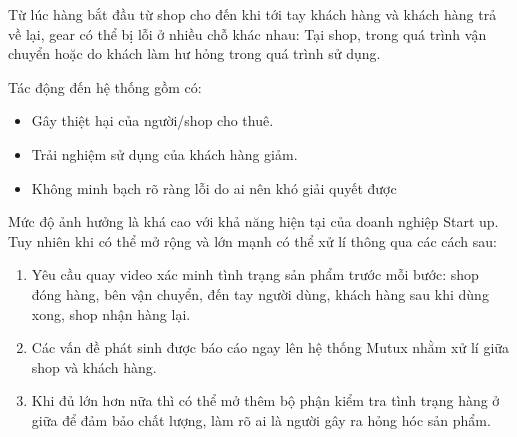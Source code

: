 Từ lúc hàng bắt đầu từ shop cho đến khi tới tay khách hàng và khách hàng trả về lại, gear có thể bị lỗi ở nhiều chỗ khác nhau: Tại shop, trong quá trình vận chuyển hoặc do khách làm hư hỏng trong quá trình sử dụng.

Tác động đến hệ thống gồm có:
\begin{itemize}
    \item Gây thiệt hại của người/shop cho thuê.
    \item Trải nghiệm sử dụng của khách hàng giảm.
    \item Không minh bạch rõ ràng lỗi do ai nên khó giải quyết được
\end{itemize}

Mức độ ảnh hưởng là khá cao với khả năng hiện tại của doanh nghiệp Start up. Tuy nhiên khi có thể mở rộng và lớn mạnh có thể xử lí thông qua các cách sau:

\begin{enumerate}
    \item Yêu cầu quay video xác minh tình trạng sản phẩm trước mỗi bước: shop đóng hàng, bên vận chuyển, đến tay người dùng, khách hàng sau khi dùng xong, shop nhận hàng lại.
    \item Các vấn đề phát sinh được báo cáo ngay lên hệ thống Mutux nhằm xử lí giữa shop và khách hàng.
    \item Khi đủ lớn hơn nữa thì có thể mở thêm bộ phận kiểm tra tình trạng hàng ở giữa để đảm bảo chất lượng, làm rõ ai là người gây ra hỏng hóc sản phẩm.
\end{enumerate}